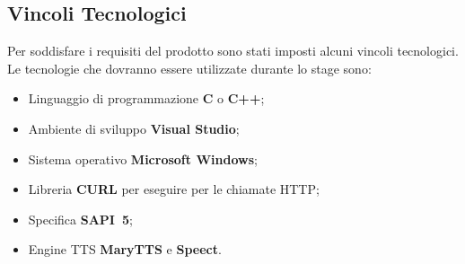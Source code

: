 \subsection{Vincoli Tecnologici}
Per soddisfare i requisiti del prodotto sono stati imposti alcuni vincoli tecnologici.\\
Le tecnologie che dovranno essere utilizzate durante lo stage sono:
\begin{itemize}
	\item Linguaggio di programmazione \textbf{C} o \textbf{C++};
	\item Ambiente di sviluppo \textbf{Visual Studio};
	\item Sistema operativo \textbf{Microsoft Windows};
	\item Libreria \textbf{CURL} per eseguire per le chiamate HTTP;
	\item Specifica \textbf{SAPI~5};
	\item Engine TTS \textbf{MaryTTS} e \textbf{Speect}.
\end{itemize}

